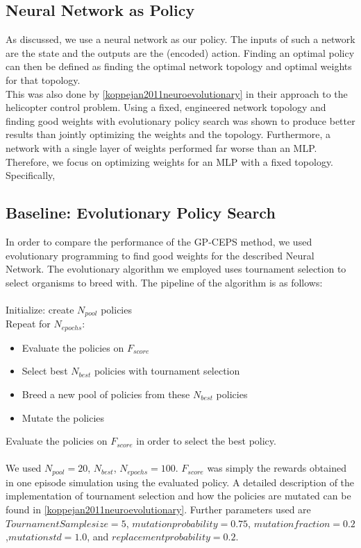 \subsection{Neural Network as Policy}

As discussed, we use a neural network as our policy. The inputs of such a network are the state and the outputs are the (encoded) action. Finding an optimal policy can then be defined as finding the optimal network topology and optimal weights for that topology.\\
This was also done by \ref{koppejan2011neuroevolutionary} in their approach to the helicopter control problem. Using a fixed, engineered network topology and finding good weights with evolutionary policy search was shown to produce better results than jointly optimizing the weights and the topology. Furthermore, a network with a single layer of weights performed far worse than an MLP. Therefore, we focus on optimizing weights for an MLP with a fixed topology.\\
Specifically, %

\subsection{Baseline: Evolutionary Policy Search}

In order to compare the performance of the GP-CEPS method, we used evolutionary programming to find good weights for the described Neural Network. 
The evolutionary algorithm we employed uses tournament selection to select organisms to breed with. The pipeline of the algorithm is as follows:\\ \\
Initialize: create $N_{pool}$ policies\\
Repeat for $N_{epochs}$:
\begin{itemize}
\item Evaluate the policies on $F_{score}$
\item Select best $N_{best}$ policies with tournament selection
\item Breed a new pool of policies from these $N_{best}$ policies
\item Mutate the policies
\end{itemize}
Evaluate the policies on $F_{score}$ in order to select the best policy.\\ \\

We used $N_{pool} = 20$, $N_{best}$, $N_{epochs} = 100$. $F_{score}$ was simply the rewards obtained in one episode simulation using the evaluated policy.  
A detailed description of the implementation of tournament selection and how the policies are mutated can be found in \ref{koppejan2011neuroevolutionary}. Further parameters used are $Tournament Samplesize = 5$, $mutation probability = 0.75$, $mutation fraction = 0.2$,$mutation std = 1.0$, and $replacement probability = 0.2$. 

